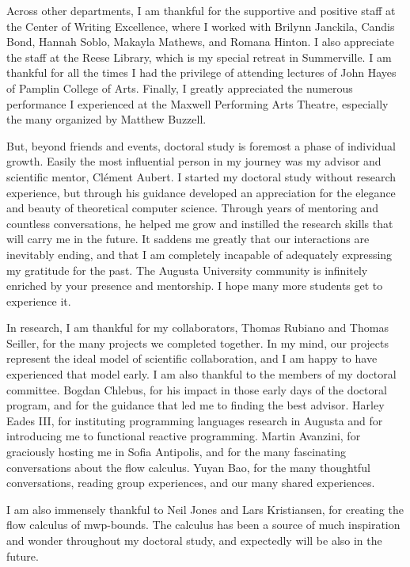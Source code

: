 Across other departments, I am thankful for the supportive and positive staff at the Center of Writing Excellence,
where I worked with Brilynn Janckila, Candis Bond, Hannah Soblo, Makayla Mathews, and Romana Hinton.
I also appreciate the staff at the Reese Library, which is my special retreat in Summerville.
I am thankful for all the times I had the privilege of attending lectures of John Hayes of Pamplin College of Arts.
Finally, I greatly appreciated the numerous performance I experienced at the Maxwell Performing Arts Theatre, especially the many organized by Matthew Buzzell.

But, beyond friends and events, doctoral study is foremost a phase of individual growth.
Easily the most influential person in my journey was my advisor and scientific mentor, Clément Aubert.
I started my doctoral study without research experience, but through his guidance developed an appreciation for the elegance and beauty of theoretical computer science.
Through years of mentoring and countless conversations, he helped me grow and instilled the research skills that will carry me in the future.
It saddens me greatly that our interactions are inevitably ending, and that I am completely incapable of adequately expressing my gratitude for the past.
The Augusta University community is infinitely enriched by your presence and mentorship.
I hope many more students get to experience it.

In research, I am thankful for my collaborators, Thomas Rubiano and Thomas Seiller, for the many projects we completed together.
In my mind, our projects represent the ideal model of scientific collaboration, and I am happy to have experienced that model early.
I am also thankful to the members of my doctoral committee.
Bogdan Chlebus, for his impact in those early days of the doctoral program, and for the guidance that led me to finding the best advisor.
Harley Eades III, for instituting programming languages research in Augusta and for introducing me to functional reactive programming.
Martin Avanzini, for graciously hosting me in Sofia Antipolis, and for the many fascinating conversations about the flow calculus.
Yuyan Bao, for the many thoughtful conversations, reading group experiences, and our many shared experiences.

I am also immensely thankful to Neil Jones and Lars Kristiansen, for creating the flow calculus of mwp-bounds.
The calculus has been a source of much inspiration and wonder throughout my doctoral study, and expectedly will be also in the future.

